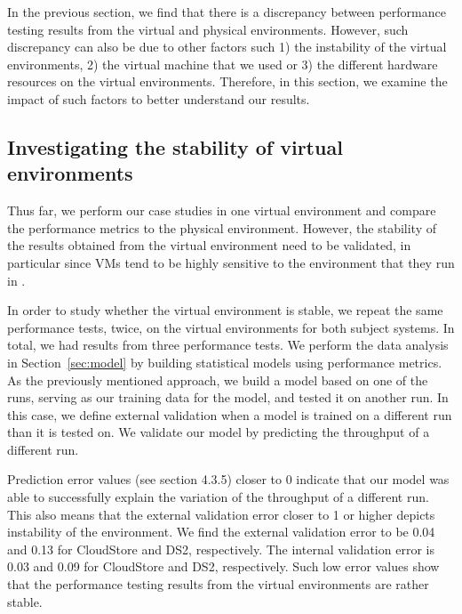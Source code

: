 
In the previous section, we find that there is a discrepancy between performance testing results from the virtual and physical environments. However, such discrepancy can also be due to other factors such 1) the instability of the virtual environments, 2) the virtual machine that we used or 3) the different hardware resources on the virtual environments. Therefore, in this section, we examine the impact of such factors to better understand our results. 


\subsection{Investigating the stability of virtual environments}

Thus far, we perform our case studies in one virtual environment and compare the performance metrics to the physical environment. However, the stability of the results obtained from the virtual environment need to be validated, in particular since VMs tend to be highly sensitive to the environment that they run in \cite{leitner}.


In order to study whether the virtual environment is stable, we repeat the same performance tests, twice, on the virtual environments for both subject systems. In total, we had results from three performance tests. We perform the data analysis in Section~\ref{sec:model} by building statistical models using performance metrics. %
As the previously mentioned approach, we build a model based on one of the runs, serving as our training data for the model, and tested it on another run. In this case, we define external validation when a model is trained on a different run than it is tested on. We validate our model by predicting the throughput of a different run.  
 
Prediction error values (see section 4.3.5) closer to 0 indicate that our model was able to successfully explain the variation of the throughput of a different run. This also means that the external validation error closer to 1 or higher depicts instability of the environment. We find the external validation error to be 0.04 and 0.13 for CloudStore and DS2, respectively. The internal validation error is 0.03 and 0.09 for CloudStore and DS2, respectively. Such low error values show that the performance testing results from the virtual environments are rather stable. 

